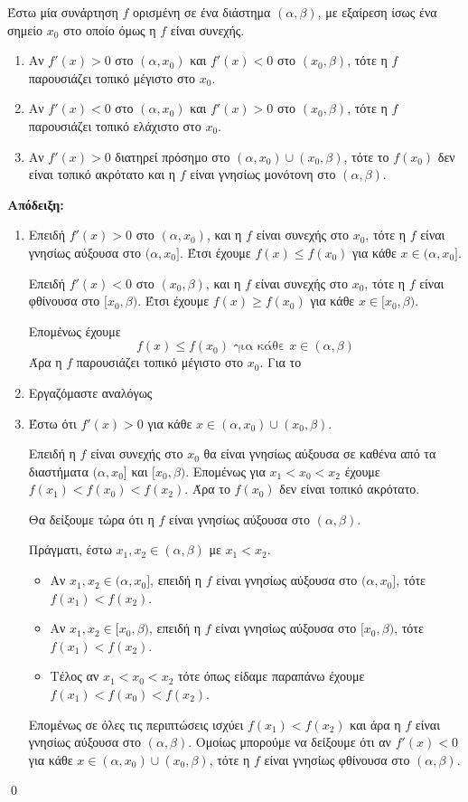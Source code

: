 \documentclass[a4paper, 12pt]{article}
\renewenvironment{proof}[1][\textbf{Απόδειξη}]{%
  \par\noindent\textbf{#1:} \rmfamily}{\qed\par}
\begin{document}
\begin{theorem}{}

  Έστω μία συνάρτηση $f$ ορισμένη σε ένα διάστημα $(α,β)$, με εξαίρεση ίσως ένα σημείο $x_0$ στο οποίο όμως η $f$ είναι συνεχής.
  \begin{enumerate}
    \item Αν $f'(x)>0$ στο $(α,x_0)$ και $f'(x)<0$ στο $(x_0,β)$, τότε η $f$ παρουσιάζει τοπικό μέγιστο στο $x_0$.
    \item Αν $f'(x)<0$ στο $(α,x_0)$ και $f'(x)>0$ στο $(x_0,β)$, τότε η $f$ παρουσιάζει τοπικό ελάχιστο στο $x_0$.
    \item Αν $f'(x)>0$ διατηρεί πρόσημο στο $(α,x_0)\cup (x_0,β)$, τότε το $f(x_0)$ δεν είναι τοπικό ακρότατο και η $f$ είναι γνησίως μονότονη στο $(α,β)$.
  \end{enumerate}
\end{theorem}
\begin{proof}
  \begin{enumerate}
    \item   Επειδή $f'(x)>0$ στο $(α,x_0)$, και η $f$ είναι συνεχής στο $x_0$, τότε η $f$ είναι γνησίως αύξουσα στο $(α,x_0]$. Έτσι έχουμε $f(x)\le f(x_0)$ για κάθε $x\in (α,x_0]$.

          Επειδή $f'(x)<0$ στο $(x_0,β)$, και η $f$ είναι συνεχής στο $x_0$, τότε η $f$ είναι φθίνουσα στο $[x_0,β)$. Έτσι έχουμε $f(x)\ge f(x_0)$ για κάθε $x\in [x_0,β)$.

          Επομένως έχουμε
          $$f(x)\le f(x_0) \text{ για κάθε } x\in (α,β)$$
          Άρα η $f$ παρουσιάζει τοπικό μέγιστο στο $x_0$.
          Για το
    \item Εργαζόμαστε αναλόγως
    \item Έστω ότι $f'(x)>0$ για κάθε $x\in (α,x_0)\cup (x_0,β)$.

          Επειδή η $f$ είναι συνεχής στο $x_0$ θα είναι γνησίως αύξουσα σε καθένα από τα διαστήματα $(α,x_0]$ και $[x_0,β)$. Επομένως για $x_1<x_0<x_2$ έχουμε $f(x_1)<f(x_0)<f(x_2)$. Άρα το $f(x_0)$ δεν είναι τοπικό ακρότατο.

          Θα δείξουμε τώρα ότι η $f$ είναι γνησίως αύξουσα στο $(α,β)$.

          Πράγματι, έστω $x_1,x_2\in (α,β)$ με $x_1<x_2$.

          \begin{itemize}
            \item Αν $x_1,x_2\in (α,x_0]$, επειδή η $f$ είναι γνησίως αύξουσα στο $(α,x_0]$, τότε $f(x_1)<f(x_2)$.
            \item Αν $x_1,x_2\in [x_0,β)$, επειδή η $f$ είναι γνησίως αύξουσα στο $[x_0,β)$, τότε $f(x_1)<f(x_2)$.
            \item Τέλος αν $x_1<x_0<x_2$ τότε όπως είδαμε παραπάνω έχουμε $f(x_1)<f(x_0)<f(x_2)$.
          \end{itemize}

          Επομένως σε όλες τις περιπτώσεις ισχύει $f(x_1)<f(x_2)$ και άρα η $f$ είναι γνησίως αύξουσα στο $(α,β)$.
          Ομοίως μπορούμε να δείξουμε ότι αν $f'(x)<0$ για κάθε $x\in (α,x_0)\cup (x_0,β)$, τότε η $f$ είναι γνησίως φθίνουσα στο $(α,β)$.
  \end{enumerate}
\end{proof}
\end{document}
